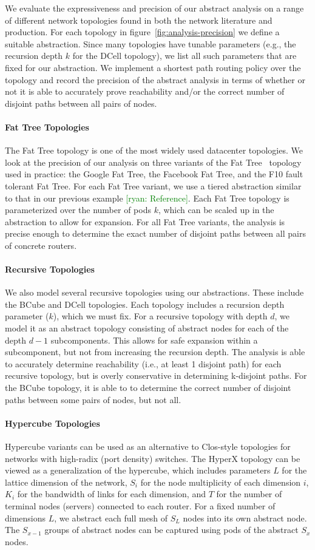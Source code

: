 \documentclass{sig-alternate-10pt}
\newcommand{\ryan}[1]{\textcolor{green}{[ryan: #1]}}
\newcommand{\para}[1]{\paragraph*{\textbf{#1}}}
\begin{document}
We evaluate the expressiveness and precision of our abstract analysis on a range of different network topologies found in both the network literature and production. For each topology in figure~\ref{fig:analysis-precision} we define a suitable abstraction. Since many topologies have tunable parameters (e.g., the recursion depth $k$ for the DCell topology), we list all such parameters that are fixed for our abstraction. We implement a shortest path routing policy over the topology and record the precision of the abstract analysis in terms of whether or not it is able to accurately prove reachability and/or the correct number of disjoint paths between all pairs of nodes.

\para{Fat Tree Topologies}

The Fat Tree topology is one of the most widely used datacenter topologies. We look at the precision of our analysis on three variants of the Fat Tree~\cite{foo} topology used in practice: the Google Fat Tree, the Facebook Fat Tree, and the F10 fault tolerant Fat Tree. For each Fat Tree variant, we use a tiered abstraction similar to that in our previous example \ryan{Reference}. Each Fat Tree topology is parameterized over the number of pods $k$, which can be scaled up in the abstraction to allow for expansion. For all Fat Tree variants, the analysis is precise enough to determine the exact number of disjoint paths between all pairs of concrete routers.

\para{Recursive Topologies}

We also model several recursive topologies using our abstractions. These include the BCube and DCell topologies. Each topology includes a recursion depth parameter ($k$), which we must fix. For a recursive topology with depth $d$, we model it as an abstract topology consisting of abstract nodes for each of the depth $d-1$ subcomponents. This allows for safe expansion within a subcomponent, but not from increasing the recursion depth. The analysis is able to accurately determine reachability (i.e., at least 1 disjoint path) for each recursive topology, but is overly conservative in determining k-disjoint paths. For the BCube topology, it is able to to determine the correct number of disjoint paths between some pairs of nodes, but not all.

\para{Hypercube Topologies}

Hypercube variants can be used as an alternative to Clos-style topologies for networks with high-radix (port density) switches. The HyperX topology can be viewed as a generalization of the hypercube, which includes parameters $L$ for the lattice dimension of the network, $S_i$ for the node multiplicity of each dimension $i$, $K_i$ for the bandwidth of links for each dimension, and $T$ for the number of terminal nodes (servers) connected to each router. For a fixed number of dimensions $L$, we abstract each full mesh of $S_L$ nodes into its own abstract node. The $S_{x-1}$ groups of abstract nodes can be captured using pods of the abstract $S_x$ nodes.
\end{document}
